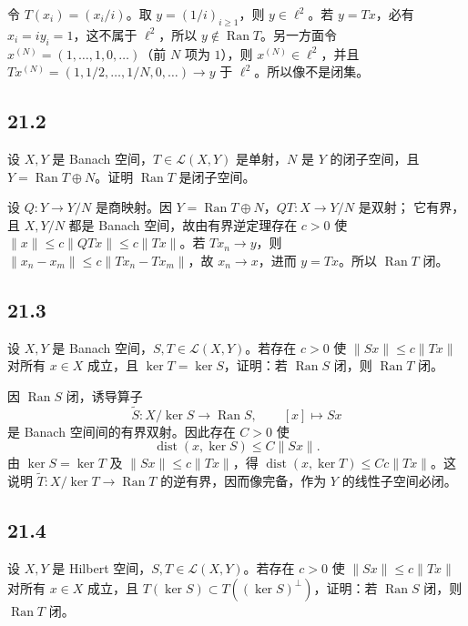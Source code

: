 令 $T(x_i)=(x_i/i)$。取 $y=(1/i)_{i\geq1}$，则 $y\in\ell^2$。若 $y=Tx$，必有
$x_i=iy_i=1$，这不属于 $\ell^2$，所以 $y\notin\operatorname{Ran}T$。另一方面令
$x^{(N)}=(1,\ldots,1,0,\ldots)$（前 $N$ 项为 $1$），则 $x^{(N)}\in\ell^2$，并且
$Tx^{(N)}=(1,1/2,\ldots,1/N,0,\ldots)\to y$ 于 $\ell^2$。所以像不是闭集。

\subsection*{21.2}
\begin{problem}
设 $X,Y$ 是 Banach 空间，$T\in\mathcal L(X,Y)$ 是单射，$N$ 是 $Y$ 的闭子空间，且
$Y=\operatorname{Ran}T\oplus N$。证明 $\operatorname{Ran}T$ 是闭子空间。
\end{problem}

设 $Q:Y\to Y/N$ 是商映射。因 $Y=\operatorname{Ran}T\oplus N$，$QT:X\to Y/N$ 是双射；
它有界，且 $X,Y/N$ 都是 Banach 空间，故由有界逆定理存在 $c>0$ 使
$\|x\|\leq c\|QTx\|\leq c\|Tx\|$。若 $Tx_n\to y$，则
$\|x_n-x_m\|\leq c\|Tx_n-Tx_m\|$，故 $x_n\to x$，进而 $y=Tx$。所以
$\operatorname{Ran}T$ 闭。

\subsection*{21.3}
\begin{problem}
设 $X,Y$ 是 Banach 空间，$S,T\in\mathcal L(X,Y)$。若存在 $c>0$ 使
$\|Sx\|\leq c\|Tx\|$ 对所有 $x\in X$ 成立，且 $\ker T=\ker S$，证明：若
$\operatorname{Ran}S$ 闭，则 $\operatorname{Ran}T$ 闭。
\end{problem}

因 $\operatorname{Ran}S$ 闭，诱导算子
\[
 \widetilde S:X/\ker S\to\operatorname{Ran}S,\qquad[x]\mapsto Sx
\]
是 Banach 空间间的有界双射。因此存在 $C>0$ 使
\[
 \operatorname{dist}(x,\ker S)\leq C\|Sx\|.
\]
由 $\ker S=\ker T$ 及 $\|Sx\|\leq c\|Tx\|$，得
$\operatorname{dist}(x,\ker T)\leq Cc\|Tx\|$。这说明
$\widetilde T:X/\ker T\to\operatorname{Ran}T$ 的逆有界，因而像完备，作为 $Y$ 的线性子空间必闭。

\subsection*{21.4}
\begin{problem}
设 $X,Y$ 是 Hilbert 空间，$S,T\in\mathcal L(X,Y)$。若存在 $c>0$ 使
$\|Sx\|\leq c\|Tx\|$ 对所有 $x\in X$ 成立，且
$T(\ker S)\subset T((\ker S)^\perp)$，证明：若 $\operatorname{Ran}S$ 闭，则
$\operatorname{Ran}T$ 闭。
\end{problem}

